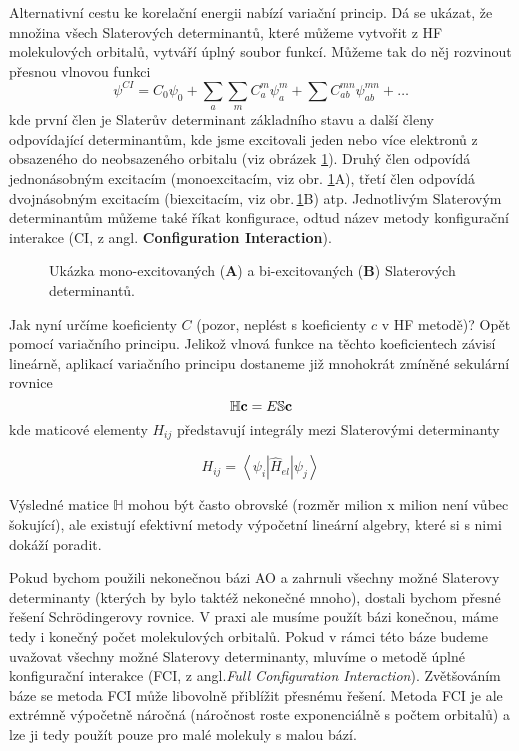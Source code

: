 Alternativní cestu ke korelační energii nabízí variační princip. Dá se ukázat, že množina všech Slaterových determinantů, které můžeme vytvořit z HF molekulových orbitalů, vytváří úplný soubor funkcí. Můžeme tak do něj rozvinout přesnou vlnovou funkci 
\begin{equation}
\psi^{CI}=C_0\psi_0+\sum_a\sum_m C_a^m\psi_a^m+\sum C_{ab}^{mn}\psi_{ab}^{mn}+\dots
\label{rov:CIrozvoj}
\end{equation}
kde první člen je Slaterův determinant základního stavu a další členy odpovídající determinantům, kde jsme excitovali jeden nebo více elektronů z obsazeného do neobsazeného orbitalu (viz obrázek \ref{obr:abinitio:ci}). Druhý člen odpovídá jednonásobným excitacím (monoexcitacím, viz obr. \ref{obr:abinitio:ci}A), třetí člen odpovídá dvojnásobným excitacím (biexcitacím,
viz obr.\,\ref{obr:abinitio:ci}B) atp. Jednotlivým Slaterovým determinantům můžeme také říkat konfigurace, odtud název metody konfigurační interakce (CI, z angl. \textbf{Configuration Interaction}).

\begin{figure}
\centering
\caption[Excitované Slaterovy determinanty]{Ukázka mono-excitovaných (\textbf{A}) a bi-excitovaných (\textbf{B}) Slaterových determinantů.}
\label{obr:abinitio:ci}
\end{figure}

Jak nyní určíme koeficienty $C$ (pozor, neplést s koeficienty $c$ v HF metodě)? Opět pomocí variačního principu. Jelikož vlnová funkce na těchto koeficientech závisí lineárně, aplikací variačního principu dostaneme již mnohokrát zmíněné sekulární rovnice
\begin{equation}
\mathbb{H}\mathbf{c}=E\mathbb{S}\mathbf{c} \nonumber \\
\end{equation}
kde maticové elementy $H_{ij}$ představují integrály mezi Slaterovými determinanty

\begin{equation}
H_{ij}= \left\langle \psi_i | \hat{H}_{el} | \psi_j \right\rangle
\end{equation}

Výsledné matice $\mathbb{H}$ mohou být často obrovské (rozměr milion x milion není vůbec šokující), ale existují efektivní metody výpočetní lineární algebry, které si s nimi dokáží poradit.

Pokud bychom použili nekonečnou bázi AO a zahrnuli všechny možné Slaterovy determinanty (kterých by bylo taktéž nekonečné mnoho), dostali bychom přesné řešení Schr\"{o}dingerovy rovnice. V praxi ale musíme použít bázi konečnou, máme tedy i konečný počet molekulových orbitalů. Pokud v rámci této báze budeme uvažovat všechny možné Slaterovy determinanty, mluvíme o metodě úplné konfigurační interakce (FCI, z angl.\textit{Full Configuration Interaction}). Zvětšováním báze se metoda FCI může libovolně přiblížit přesnému řešení. Metoda FCI je ale extrémně výpočetně náročná (náročnost roste exponenciálně s počtem orbitalů) a lze ji tedy použít pouze pro malé molekuly s malou bází.

